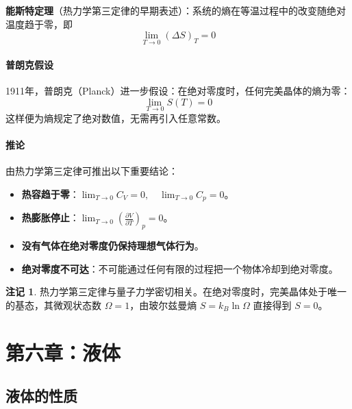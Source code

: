 \documentclass[UTF8]{ctexart}
\theoremstyle{definition}
\newtheorem{remark}{注记}
\begin{document}
\textbf{能斯特定理}（热力学第三定律的早期表述）：系统的熵在等温过程中的改变随绝对温度趋于零，即
\begin{equation}
\boxed{\lim_{T\to 0}(\Delta S)_T = 0}
\end{equation}

\paragraph{普朗克假设}

1911年，普朗克（Planck）进一步假设：在绝对零度时，任何完美晶体的熵为零：
\begin{equation}
\boxed{\lim_{T\to 0} S(T) = 0}
\end{equation}
这样便为熵规定了绝对数值，无需再引入任意常数。

\paragraph{推论}

由热力学第三定律可推出以下重要结论：

\begin{itemize}
\item \textbf{热容趋于零}：$\displaystyle\lim_{T\to 0} C_V = 0,\quad \lim_{T\to 0} C_p = 0$。
\item \textbf{热膨胀停止}：$\displaystyle\lim_{T\to 0}\left(\frac{\partial V}{\partial T}\right)_p = 0$。
\item \textbf{没有气体在绝对零度仍保持理想气体行为}。
\item \textbf{绝对零度不可达}：不可能通过任何有限的过程把一个物体冷却到绝对零度。
\end{itemize}

\begin{remark}
热力学第三定律与量子力学密切相关。在绝对零度时，完美晶体处于唯一的基态，其微观状态数 $\Omega=1$，由玻尔兹曼熵 $S=k_B\ln\Omega$ 直接得到 $S=0$。
\end{remark}

\newpage
\section{第六章：液体}

\subsection{液体的性质}
\end{document}
